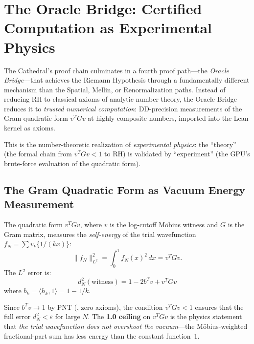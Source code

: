 
\section{The Oracle Bridge: Certified Computation as Experimental Physics}
\label{sec:oracle}

The Cathedral's proof chain culminates in a fourth proof path---the
\emph{Oracle Bridge}---that achieves the Riemann Hypothesis through
a fundamentally different mechanism than the Spatial, Mellin, or
Renormalization paths. Instead of reducing RH to classical axioms of
analytic number theory, the Oracle Bridge reduces it to \emph{trusted
numerical computation}: DD-precision measurements of the Gram quadratic
form $v^T G v$ at highly composite numbers, imported into the Lean
kernel as axioms.

This is the number-theoretic realization of \emph{experimental physics}:
the ``theory'' (the formal chain from $v^T G v < 1$ to RH) is validated
by ``experiment'' (the GPU's brute-force evaluation of the quadratic form).

\subsection{The Gram Quadratic Form as Vacuum Energy Measurement}

The quadratic form $v^T G v$, where $v$ is the log-cutoff Möbius witness
and $G$ is the Gram matrix, measures the \emph{self-energy} of the trial
wavefunction $f_N = \sum v_k \{1/(kx)\}$:
\[
  \|f_N\|_{L^2}^2 = \int_0^1 f_N(x)^2\,dx = v^T G v.
\]
The $L^2$ error is:
\begin{equation}
  d_N^2(\text{witness}) = 1 - 2 b^T v + v^T G v
  \label{eq:oracle-error}
\end{equation}
where $b_k = \langle h_k, 1 \rangle = 1 - 1/k$.

Since $b^T v \to 1$ by PNT (,
zero axioms), the condition $v^T G v < 1$ ensures that the full error
$d_N^2 < \varepsilon$ for large $N$. The \textbf{1.0 ceiling} on $v^T G v$
is the physics statement that \emph{the trial wavefunction does not overshoot
the vacuum}---the Möbius-weighted fractional-part sum has less energy
than the constant function~1.

